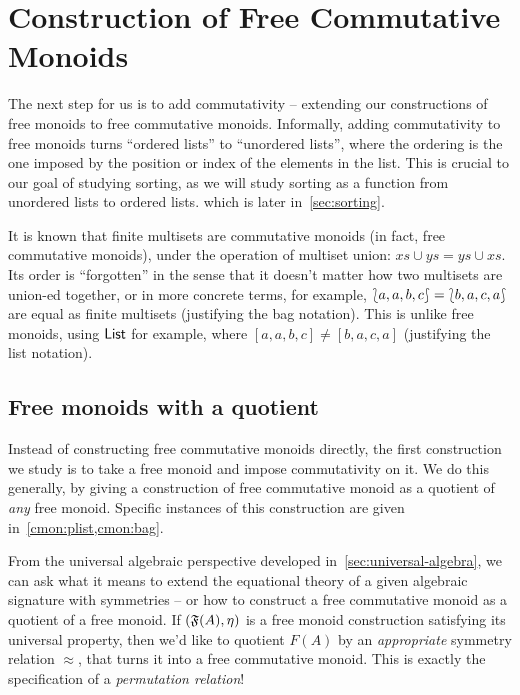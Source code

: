 
\section{Construction of Free Commutative Monoids}
\label{sec:commutative-monoids}

The next step for us is to add commutativity -- extending our constructions of free monoids to free commutative monoids.
%
Informally, adding commutativity to free monoids turns ``ordered lists'' to ``unordered lists'',
where the ordering is the one imposed by the position or index of the elements in the list.
%
This is crucial to our goal of studying sorting,
as we will study sorting as a function from unordered lists to ordered lists.
which is later in~\cref{sec:sorting}.

It is known that finite multisets are commutative monoids (in fact, free commutative monoids),
under the operation of multiset union: $xs \cup ys = ys \cup xs$.
%
Its order is ``forgotten'' in the sense that it doesn't matter how two multisets are union-ed together,
or in more concrete terms, for example, ${\lbag}{a, a, b, c}{\rbag} = {\lbag}{b, a, c, a}{\rbag}$ are equal as finite multisets
(justifying the bag notation).
%
This is unlike free monoids, using $\operatorname{\mathsf{List}}$ for example,
where $[a, a, b, c] \neq [b, a, c, a]$ (justifying the list notation).

\subsection{Free monoids with a quotient}\label{cmon:qfreemon}

Instead of constructing free commutative monoids directly, the first construction we study is to take a free monoid and
impose commutativity on it.
%
We do this generally, by giving a construction of free commutative monoid as a quotient of \emph{any} free monoid.
%
Specific instances of this construction are given in~\cref{cmon:plist,cmon:bag}.

From the universal algebraic perspective developed in~\cref{sec:universal-algebra},
we can ask what it means to extend the equational theory of a given algebraic signature with symmetries --
or how to construct a free commutative monoid as a quotient of a free monoid.
%
If $(\mathfrak{F}(A), \eta)$ is a free monoid construction satisfying its universal property,
then we'd like to quotient $F(A)$ by an \emph{appropriate} symmetry relation $\approx$,
that turns it into a free commutative monoid.
%
This is exactly the specification of a \emph{permutation relation}!

